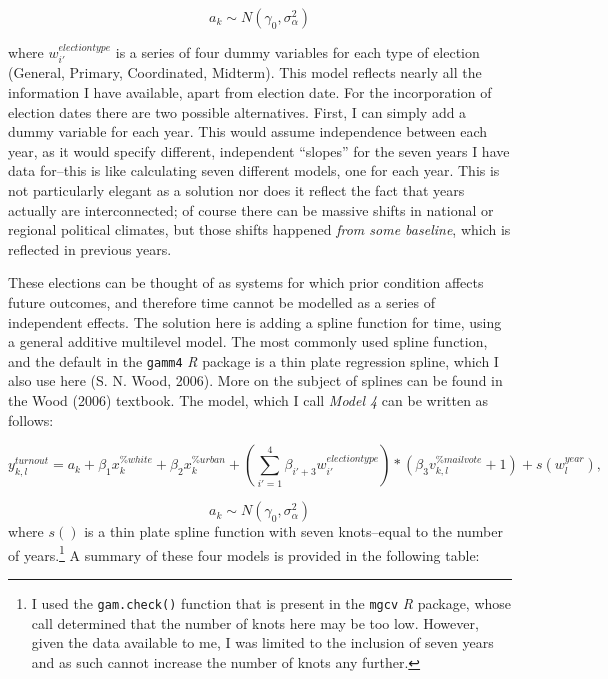 \documentclass[12pt,twoside]{reedthesis}
\begin{document}
  \[a_{k} \sim N(\gamma_0, \sigma_{\alpha}^2)\]
  
  where \(w_{i'}^{election type}\) is a series of four dummy variables for
  each type of election (General, Primary, Coordinated, Midterm). This
  model reflects nearly all the information I have available, apart from
  election date. For the incorporation of election dates there are two
  possible alternatives. First, I can simply add a dummy variable for each
  year. This would assume independence between each year, as it would
  specify different, independent ``slopes'' for the seven years I have
  data for--this is like calculating seven different models, one for each
  year. This is not particularly elegant as a solution nor does it reflect
  the fact that years actually are interconnected; of course there can be
  massive shifts in national or regional political climates, but those
  shifts happened \emph{from some baseline}, which is reflected in
  previous years.
  
  These elections can be thought of as systems for which prior condition
  affects future outcomes, and therefore time cannot be modelled as a
  series of independent effects. The solution here is adding a spline
  function for time, using a general additive multilevel model. The most
  commonly used spline function, and the default in the \texttt{gamm4}
  \textit{R} package is a thin plate regression spline, which I also use
  here (S. N. Wood, 2006). More on the subject of splines can be found in
  the Wood (2006) textbook. The model, which I call \emph{Model 4} can be
  written as follows:
  
  \[y^{turnout}_{k,l} = a_{k} + \beta_{1}x_k^{\% white} + \beta_{2}x_k^{\% urban} + (\sum_{i'=1}^{4}\beta_{i'+3}w_{i'}^{election type})*(\beta_3v_{k,l}^{\% mail vote} + 1) + s(w^{year}_{l}),\]
  
  \[a_{k} \sim N(\gamma_0, \sigma_{\alpha}^2)\] where \(s()\) is a thin
  plate spline function with seven knots--equal to the number of
  years.\footnote{I used the \texttt{gam.check()} function that is present
    in the \texttt{mgcv} \textit{R} package, whose call determined that
    the number of knots here may be too low. However, given the data
    available to me, I was limited to the inclusion of seven years and as
    such cannot increase the number of knots any further.} A summary of
  these four models is provided in the following table:
  
\end{document}

